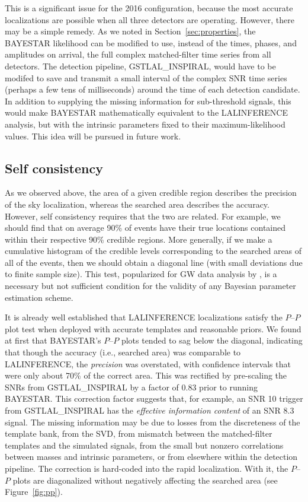 \documentclass[amsmath,amssymb,aps,prx,reprint,nopreprintnumbers,nofootinbib]{revtex4-1}
\begin{document}
This is a significant issue for the 2016 configuration, because the most accurate localizations are possible when all three detectors are operating. However, there may be a simple remedy. As we noted in Section~\ref{sec:properties}, the \ac{BAYESTAR} likelihood can be modified to use, instead of the times, phases, and amplitudes on arrival, the full complex matched\nobreakdashes-filter time series from all detectors. The detection pipeline, GSTLAL\_INSPIRAL, would have to be modifed to save and transmit a small interval of the complex \ac{SNR} time series (perhaps a few tens of milliseconds) around the time of each detection candidate. In addition to supplying the missing information for sub\nobreakdashes-threshold signals, this would make \ac{BAYESTAR} mathematically equivalent to the LALINFERENCE analysis, but with the intrinsic parameters fixed to their maximum\nobreakdashes-likelihood values. This idea will be pursued in future work.

\subsection{Self consistency}

As we observed above, the area of a given credible region describes the precision of the sky localization, whereas the searched area describes the accuracy. However, self consistency requires that the two are related. For example, we should find that on average 90\% of events have their true locations contained within their respective 90\% credible regions. More generally, if we make a cumulative histogram of the credible levels corresponding to the searched areas of all of the events, then we should obtain a diagonal line (with small deviations due to finite sample size). This test, popularized for \ac{GW} data analysis by \cite{SiderySkyLocalizationComparison}, is a necessary but not sufficient condition for the validity of any Bayesian parameter estimation scheme.

It is already well established that LALINFERENCE localizations satisfy the $P$\nobreakdashes--$P$ plot test when deployed with accurate templates and reasonable priors. We found at first that \ac{BAYESTAR}'s $P$\nobreakdashes--$P$ plots tended to sag below the diagonal, indicating that though the accuracy (i.e., searched area) was comparable to LALINFERENCE, the \emph{precision} was overstated, with confidence intervals that were only about 70\% of the correct area. This was rectified by pre\nobreakdashes-scaling the \acp{SNR} from GSTLAL\_INSPIRAL by a factor of 0.83 prior to running \ac{BAYESTAR}. This correction factor suggests that, for example, an \ac{SNR} 10 trigger from GSTLAL\_INSPIRAL has the \emph{effective information content} of an \ac{SNR} 8.3 signal. The missing information may be due to losses from the discreteness of the template bank, from the \ac{SVD}, from mismatch between the matched\nobreakdashes-filter templates and the simulated signals, from the small but nonzero correlations between masses and intrinsic parameters, or from elsewhere within the detection pipeline. The correction is hard\nobreakdashes-coded into the rapid localization. With it, the $P$\nobreakdashes--$P$ plots are diagonalized without negatively affecting the searched area (see Figure~\ref{fig:pp}).
\end{document}
